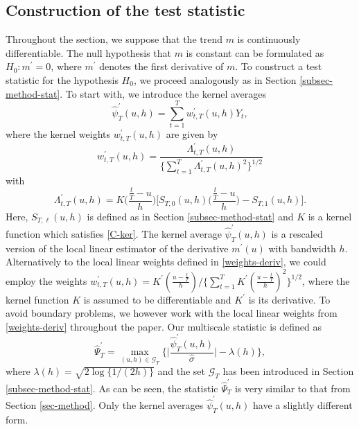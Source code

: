 \subsection{Construction of the test statistic}\label{subsec-test-shape-stat}


Throughout the section, we suppose that the trend $m$ is continuously differentiable. The null hypothesis that $m$ is constant can be formulated as $H_0: m^\prime = 0$, where $m^\prime$ denotes the first derivative of $m$. To construct a test statistic for the hypothesis $H_0$, we proceed analogously as in Section \ref{subsec-method-stat}. To start with, we introduce the kernel averages 
\begin{equation*}
\widehat{\psi}_T^\prime(u,h) = \sum\limits_{t=1}^T w_{t,T}^\prime(u,h) Y_t, 
\end{equation*}
where the kernel weights $w_{t,T}^\prime(u,h)$ are given by 
\begin{equation}\label{weights-deriv}
w_{t,T}^\prime(u,h) = \frac{\Lambda_{t,T}^\prime(u,h)}{ \{\sum\nolimits_{t=1}^T \Lambda_{t,T}^\prime(u,h)^2 \}^{1/2} } 
\end{equation}
with
\[ \Lambda_{t,T}^\prime(u,h) = K\Big(\frac{\frac{t}{T}-u}{h}\Big) \Big[ S_{T,0}(u,h) \Big(\frac{\frac{t}{T}-u}{h}\Big) - S_{T,1}(u,h) \Big]. \]
Here, $S_{T,\ell}(u,h)$ is defined as in Section \ref{subsec-method-stat} and $K$ is a kernel function which satisfies \ref{C-ker}. The kernel average $\widehat{\psi}_T^\prime(u,h)$ is a rescaled version of the local linear estimator of the derivative $m^\prime(u)$ with bandwidth $h$. Alternatively to the local linear weights defined in \eqref{weights-deriv}, we could employ the weights $w_{t,T}^\prime(u,h) = K^\prime( \frac{u - \frac{t}{T}}{h} )/ \{ \sum\nolimits_{t=1}^T  K^\prime( \frac{u - \frac{t}{T}}{h} )^2 \}^{1/2}$, where the kernel function $K$ is assumed to be differentiable and $K^\prime$ is its derivative. To avoid boundary problems, we however work with the local linear weights from \eqref{weights-deriv} throughout the paper. Our multiscale statistic is defined as 
\[ \widehat{\Psi}_T^\prime = \max_{(u,h) \in \mathcal{G}_T} \Big\{ \Big|\frac{\widehat{\psi}_T^\prime(u,h)}{\widehat{\sigma}}\Big| - \lambda(h) \Big\}, \] 
where $\lambda(h) = \sqrt{2 \log \{ 1/(2h) \}}$ and the set $\mathcal{G}_T$ has been introduced in Section \ref{subsec-method-stat}. As can be seen, the statistic $\widehat{\Psi}_T^\prime$ is very similar to that from Section \ref{sec-method}. Only the kernel averages $\widehat{\psi}_T^\prime(u,h)$ have a slightly different form. 


